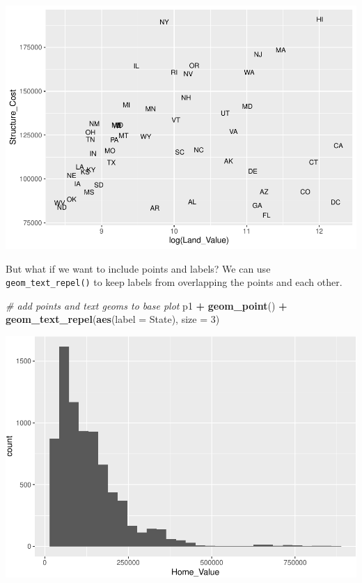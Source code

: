 \documentclass[
]{book}
\newenvironment{Shaded}{\begin{snugshade}}{\end{snugshade}}
\newcommand{\CommentTok}[1]{\textcolor[rgb]{0.56,0.35,0.01}{\textit{#1}}}
\newcommand{\DataTypeTok}[1]{\textcolor[rgb]{0.13,0.29,0.53}{#1}}
\newcommand{\DecValTok}[1]{\textcolor[rgb]{0.00,0.00,0.81}{#1}}
\newcommand{\KeywordTok}[1]{\textcolor[rgb]{0.13,0.29,0.53}{\textbf{#1}}}
\newcommand{\NormalTok}[1]{#1}
\newcommand{\OperatorTok}[1]{\textcolor[rgb]{0.81,0.36,0.00}{\textbf{#1}}}
\newcommand{\StringTok}[1]{\textcolor[rgb]{0.31,0.60,0.02}{#1}}
\begin{document}
\includegraphics{R/Rgraphics/figures/unnamed-chunk-162-1.pdf}

But what if we want to include points and labels? We can use \texttt{geom\_text\_repel()} to keep labels from overlapping the points and each other.

\begin{Shaded}
\begin{Highlighting}[]
\CommentTok{\# add points and text geoms to base plot}
\NormalTok{p1 }\OperatorTok{+}\StringTok{ }
\StringTok{  }\KeywordTok{geom\_point}\NormalTok{() }\OperatorTok{+}\StringTok{ }
\StringTok{  }\KeywordTok{geom\_text\_repel}\NormalTok{(}\KeywordTok{aes}\NormalTok{(}\DataTypeTok{label =}\NormalTok{ State), }\DataTypeTok{size =} \DecValTok{3}\NormalTok{)}
\end{Highlighting}
\end{Shaded}

\includegraphics{R/Rgraphics/figures/unnamed-chunk-163-1.pdf}
\end{document}
